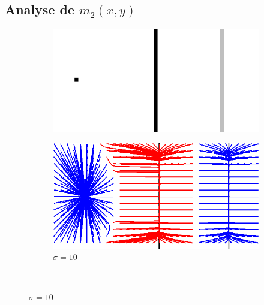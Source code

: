 \begin{appendices}
\subsection{Analyse de $m_2(x,y)$}
\begin{figure}[H]
   \begin{subfigure}[c]{.5\linewidth}
     \centering
     \includegraphics[width=\textwidth]{Chapters/Images/synthetic_map.png}
     \caption{}
   \end{subfigure} 
      \begin{subfigure}[c]{.5\linewidth}
     \centering
     \includegraphics[width=\textwidth]{Chapters/Images/m2_sigma_10.png}
     \caption{$\sigma=10$}
   \end{subfigure} \\
   

\end{figure}
\end{appendices}
